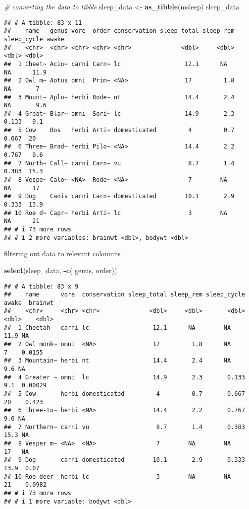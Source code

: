 \documentclass[
]{article}
\newenvironment{Shaded}{\begin{snugshade}}{\end{snugshade}}
\newcommand{\CommentTok}[1]{\textcolor[rgb]{0.56,0.35,0.01}{\textit{#1}}}
\newcommand{\FunctionTok}[1]{\textcolor[rgb]{0.13,0.29,0.53}{\textbf{#1}}}
\newcommand{\NormalTok}[1]{#1}
\newcommand{\OtherTok}[1]{\textcolor[rgb]{0.56,0.35,0.01}{#1}}
\newcommand{\SpecialCharTok}[1]{\textcolor[rgb]{0.81,0.36,0.00}{\textbf{#1}}}
\begin{document}
\begin{Shaded}
\begin{Highlighting}[]
\CommentTok{\# converting the data to tibble}
\NormalTok{sleep\_data }\OtherTok{\textless{}{-}} \FunctionTok{as\_tibble}\NormalTok{(msleep)}
\NormalTok{sleep\_data}
\end{Highlighting}
\end{Shaded}

\begin{verbatim}
## # A tibble: 83 x 11
##    name   genus vore  order conservation sleep_total sleep_rem sleep_cycle awake
##    <chr>  <chr> <chr> <chr> <chr>              <dbl>     <dbl>       <dbl> <dbl>
##  1 Cheet~ Acin~ carni Carn~ lc                  12.1      NA        NA      11.9
##  2 Owl m~ Aotus omni  Prim~ <NA>                17         1.8      NA       7  
##  3 Mount~ Aplo~ herbi Rode~ nt                  14.4       2.4      NA       9.6
##  4 Great~ Blar~ omni  Sori~ lc                  14.9       2.3       0.133   9.1
##  5 Cow    Bos   herbi Arti~ domesticated         4         0.7       0.667  20  
##  6 Three~ Brad~ herbi Pilo~ <NA>                14.4       2.2       0.767   9.6
##  7 North~ Call~ carni Carn~ vu                   8.7       1.4       0.383  15.3
##  8 Vespe~ Calo~ <NA>  Rode~ <NA>                 7        NA        NA      17  
##  9 Dog    Canis carni Carn~ domesticated        10.1       2.9       0.333  13.9
## 10 Roe d~ Capr~ herbi Arti~ lc                   3        NA        NA      21  
## # i 73 more rows
## # i 2 more variables: brainwt <dbl>, bodywt <dbl>
\end{verbatim}

filtering out data to relevant coloumns

\begin{Shaded}
\begin{Highlighting}[]
\FunctionTok{select}\NormalTok{(sleep\_data, }\SpecialCharTok{{-}}\FunctionTok{c}\NormalTok{( genus, order))}
\end{Highlighting}
\end{Shaded}

\begin{verbatim}
## # A tibble: 83 x 9
##    name      vore  conservation sleep_total sleep_rem sleep_cycle awake  brainwt
##    <chr>     <chr> <chr>              <dbl>     <dbl>       <dbl> <dbl>    <dbl>
##  1 Cheetah   carni lc                  12.1      NA        NA      11.9 NA      
##  2 Owl monk~ omni  <NA>                17         1.8      NA       7    0.0155 
##  3 Mountain~ herbi nt                  14.4       2.4      NA       9.6 NA      
##  4 Greater ~ omni  lc                  14.9       2.3       0.133   9.1  0.00029
##  5 Cow       herbi domesticated         4         0.7       0.667  20    0.423  
##  6 Three-to~ herbi <NA>                14.4       2.2       0.767   9.6 NA      
##  7 Northern~ carni vu                   8.7       1.4       0.383  15.3 NA      
##  8 Vesper m~ <NA>  <NA>                 7        NA        NA      17   NA      
##  9 Dog       carni domesticated        10.1       2.9       0.333  13.9  0.07   
## 10 Roe deer  herbi lc                   3        NA        NA      21    0.0982 
## # i 73 more rows
## # i 1 more variable: bodywt <dbl>
\end{verbatim}
\end{document}
